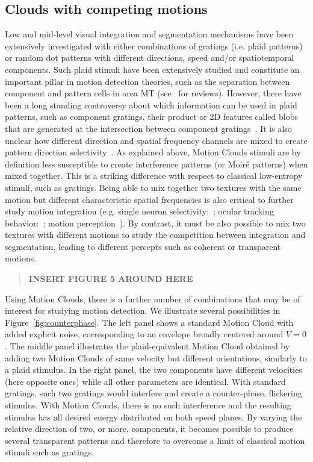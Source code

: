 \documentclass[a4paper,11pt]{article}%
\begin{document}
\subsection{Clouds with competing motions}%
Low and mid-level visual integration and segmentation mechanisms have been extensively investigated with either combinations of gratings (i.e. plaid patterns) or random dot patterns with different directions, speed and/or spatiotemporal components. Such plaid stimuli have been extensively studied and constitute an important pillar in motion detection theories, such as the separation between component and pattern cells in area MT (see~\citep{Movshon85,Burr11,Bradley05} for reviews). However, there have been a long standing controversy about which information can be used in plaid patterns, such as component gratings, their product or 2D features called blobs that are generated at the intersection between component gratings~\citep{Derrington04}. It is also unclear how different direction and spatial frequency channels are mixed to create pattern direction selectivity~\citep{Rust06}. As explained above, Motion Clouds stimuli are by definition less susceptible to create interference patterns (or Moir{\'e} patterns) when mixed together. This is a striking difference with respect to classical low-entropy stimuli, such as gratings. Being able to mix together two textures with the same motion but different characteristic spatial frequencies is also critical to further study motion integration (e.g. single neuron selectivity:~\citep{Rust05}; ocular tracking behavior:~\citep{Masson02}; motion perception~\citep{smith90}). By contrast, it must be also possible to mix two textures with different motions to study the competition between integration and segmentation, leading to different percepts such as coherent or transparent motions. %

\begin{quote}
	\begin{center}
		\textbf{INSERT FIGURE 5 AROUND HERE}
	\end{center}
\end{quote}

Using Motion Clouds, there is a further number of combinations that may be of interest for studying motion detection. We illustrate several possibilities in Figure~\ref{fig:counterphase}. The left panel shows a standard Motion Cloud with added explicit noise, corresponding to an envelope broadly centered around $V=0$. The middle panel illustrates the plaid-equivalent Motion Cloud obtained by adding two Motion Clouds of same velocity but different orientations, similarly to a plaid stimulus. In the right panel, the two components have different velocities (here opposite ones) while all other parameters are identical. With standard gratings, such two gratings would interfere and create a {counter-phase}, flickering stimulus. With Motion Clouds, there is no such interference and the resulting stimulus has all desired energy distributed on both speed planes. By varying the relative direction of two, or more, components, it becomes possible to produce several transparent patterns and therefore to overcome a limit of classical motion stimuli such as gratings. %
\end{document}
